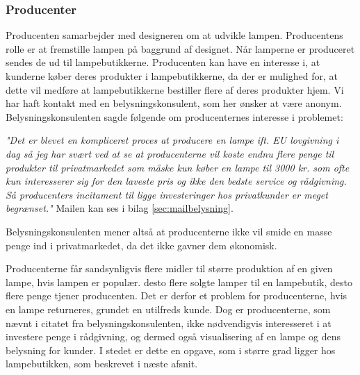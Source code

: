 \subsubsection{Producenter}
Producenten samarbejder med designeren om at udvikle lampen. Producentens rolle er at fremstille lampen på baggrund af designet. Når lamperne er produceret sendes de ud til lampebutikkerne. Producenten kan have en interesse i, at kunderne køber deres produkter i lampebutikkerne, da der er mulighed for, at dette vil medføre at lampebutikkerne bestiller flere af deres produkter hjem. Vi har haft kontakt med en belysningskonsulent, som her ønsker at være anonym. Belysningskonsulenten sagde følgende om producenternes interesse i problemet:

\begin{center}
\textit{"Det er blevet en kompliceret proces at producere en lampe ift. EU lovgivning i dag så jeg har svært ved at se at producenterne vil koste endnu flere penge til produkter til privatmarkedet som måske kun køber en lampe til 3000 kr. som ofte kun interesserer sig for den laveste pris og ikke den bedste service og rådgivning. Så producenters incitament til ligge investeringer hos privatkunder er meget begrænset."} Mailen kan ses i bilag \ref{sec:mailbelysning}. 
\end{center}

Belysningskonsulenten mener altså at producenterne ikke vil smide en masse penge ind i privatmarkedet, da det ikke gavner dem økonomisk. 

Producenterne får sandsynligvis flere midler til større produktion af en given lampe, hvis lampen er populær. desto flere solgte lamper til en lampebutik, desto flere penge tjener producenten. Det er derfor et problem for producenterne, hvis en lampe returneres, grundet en utilfreds kunde. Dog er producenterne, som nævnt i citatet fra belysningskonsulenten, ikke nødvendigvis interesseret i at investere penge i rådgivning, og dermed også visualisering af en lampe og dens belysning for kunder. I stedet er dette en opgave, som i større grad ligger hos lampebutikken, som beskrevet i næste afsnit.
